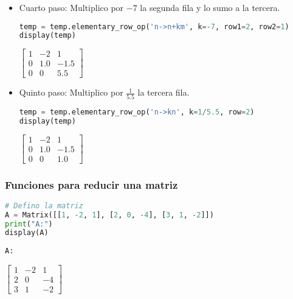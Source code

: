 \documentclass[a4,11pt]{aleph-notas}
\begin{document}
\begin{itemize}
\item
    Cuarto paso: Multiplico por \(-7\) la segunda fila y lo sumo a la tercera.
\begin{pycodigo}
    \begin{ipynbcodigo}\begin{lstlisting}[language=Python]
temp = temp.elementary_row_op('n->n+km', k=-7, row1=2, row2=1)
display(temp)
    \end{lstlisting}\end{ipynbcodigo}
    \begin{ipynbsalida}[2mm]
$\displaystyle \left[\begin{matrix}1 & -2 & 1\\0 & 1.0 & -1.5\\0 & 0 & 5.5\end{matrix}\right]$
    \end{ipynbsalida}
\end{pycodigo}

\item
    Quinto paso: Multiplico por \(\frac{1}{5.5}\) la tercera fila.
\begin{pycodigo}
    \begin{ipynbcodigo}\begin{lstlisting}[language=Python]
temp = temp.elementary_row_op('n->kn', k=1/5.5, row=2)
display(temp)
    \end{lstlisting}\end{ipynbcodigo}
    \begin{ipynbsalida}[2mm]
$\displaystyle \left[\begin{matrix}1 & -2 & 1\\0 & 1.0 & -1.5\\0 & 0 & 1.0\end{matrix}\right]$
    \end{ipynbsalida}
\end{pycodigo}
\end{itemize}

\subsubsection{Funciones para reducir una matriz}

\begin{pycodigo}
    \begin{ipynbcodigo}\begin{lstlisting}[language=Python]
# Defino la matriz
A = Matrix([[1, -2, 1], [2, 0, -4], [3, 1, -2]])
print("A:")
display(A)
    \end{lstlisting}\end{ipynbcodigo}
    \begin{ipynbsalida}
    \begin{Verbatim}
A:
    \end{Verbatim}
    $\displaystyle \left[\begin{matrix}1 & -2 & 1\\2 & 0 & -4\\3 & 1 & -2\end{matrix}\right]$
    \end{ipynbsalida}
\end{pycodigo}
\end{document}
